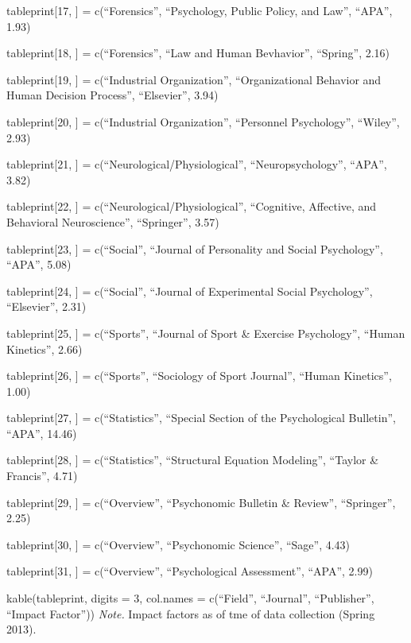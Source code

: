 \documentclass[english,man]{apa6}
\theoremstyle{definition}
\theoremstyle{definition}
\theoremstyle{definition}
\theoremstyle{remark}
\begin{document}
tableprint{[}17, {]} = c(\enquote{Forensics}, \enquote{Psychology,
Public Policy, and Law}, \enquote{APA}, 1.93)

tableprint{[}18, {]} = c(\enquote{Forensics}, \enquote{Law and Human
Bevhavior}, \enquote{Spring}, 2.16)

tableprint{[}19, {]} = c(\enquote{Industrial Organization},
\enquote{Organizational Behavior and Human Decision Process},
\enquote{Elsevier}, 3.94)

tableprint{[}20, {]} = c(\enquote{Industrial Organization},
\enquote{Personnel Psychology}, \enquote{Wiley}, 2.93)

tableprint{[}21, {]} = c(\enquote{Neurological/Physiological},
\enquote{Neuropsychology}, \enquote{APA}, 3.82)

tableprint{[}22, {]} = c(\enquote{Neurological/Physiological},
\enquote{Cognitive, Affective, and Behavioral Neuroscience},
\enquote{Springer}, 3.57)

tableprint{[}23, {]} = c(\enquote{Social}, \enquote{Journal of
Personality and Social Psychology}, \enquote{APA}, 5.08)

tableprint{[}24, {]} = c(\enquote{Social}, \enquote{Journal of
Experimental Social Psychology}, \enquote{Elsevier}, 2.31)

tableprint{[}25, {]} = c(\enquote{Sports}, \enquote{Journal of Sport \&
Exercise Psychology}, \enquote{Human Kinetics}, 2.66)

tableprint{[}26, {]} = c(\enquote{Sports}, \enquote{Sociology of Sport
Journal}, \enquote{Human Kinetics}, 1.00)

tableprint{[}27, {]} = c(\enquote{Statistics}, \enquote{Special Section
of the Psychological Bulletin}, \enquote{APA}, 14.46)

tableprint{[}28, {]} = c(\enquote{Statistics}, \enquote{Structural
Equation Modeling}, \enquote{Taylor \& Francis}, 4.71)

tableprint{[}29, {]} = c(\enquote{Overview}, \enquote{Psychonomic
Bulletin \& Review}, \enquote{Springer}, 2.25)

tableprint{[}30, {]} = c(\enquote{Overview}, \enquote{Psychonomic
Science}, \enquote{Sage}, 4.43)

tableprint{[}31, {]} = c(\enquote{Overview}, \enquote{Psychological
Assessment}, \enquote{APA}, 2.99)

kable(tableprint, digits = 3, col.names = c(\enquote{Field},
\enquote{Journal}, \enquote{Publisher}, \enquote{Impact Factor}))
\emph{Note.} Impact factors as of tme of data collection (Spring 2013).
\end{document}
